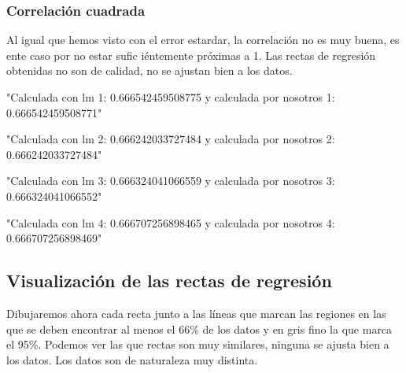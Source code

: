 \documentclass [a4paper] {article}
\begin{document}
\subsubsection{Correlación cuadrada}
Al igual que hemos visto con el error estardar, la correlación no es muy buena, es ente caso por no estar sufic iéntemente próximas a 1.
Las rectas de regresión obtenidas no son de calidad, no se ajustan bien a los datos.
\begin{Schunk}
\begin{Soutput}
[1] "Calculada con lm 1: 0.666542459508775 y calculada por nosotros 1: 0.666542459508771"
\end{Soutput}
\begin{Soutput}
[1] "Calculada con lm 2: 0.666242033727484 y calculada por nosotros 2: 0.666242033727484"
\end{Soutput}
\begin{Soutput}
[1] "Calculada con lm 3: 0.666324041066559 y calculada por nosotros 3: 0.666324041066552"
\end{Soutput}
\begin{Soutput}
[1] "Calculada con lm 4: 0.666707256898465 y calculada por nosotros 4: 0.666707256898469"
\end{Soutput}
\end{Schunk}

\subsection{Visualización de las rectas de regresión}
Dibujaremos ahora cada recta junto a las líneas que marcan las regiones en las que se deben encontrar al menos el 66\% de los datos y en gris fino la que marca el 95\%.
Podemos ver las que rectas son muy similares, ninguna se ajusta bien a los datos.
Los datos son de naturaleza muy distinta.
\end{document}
